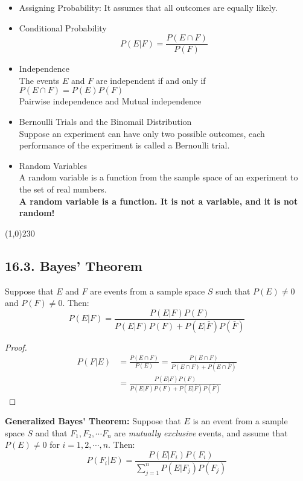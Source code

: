 \begin{itemize}
    \item Assigning Probability: It assumes that all outcomes are equally likely.
    \item Conditional Probability
    $$P(E|F) = \frac{P(E \cap F)}{P(F)}$$
    \item Independence \\
    The events $E$ and $F$ are independent if and only if $P(E \cap F) = P(E)P(F)$ \\
    Pairwise independence and Mutual independence
    \item Bernoulli Trials and the Binomail Distribution\\
    Suppose an experiment can have only two possible outcomes, each performance of the experiment is called a Bernoulli trial.
    \item Random Variables \\
    A random variable is a function from the sample space of an experiment to the set of real numbers. \\
    \textbf{A random variable is a function. It is not a variable, and it is not random!}
\end{itemize}

\begin{center}
\line(1,0){230}
\end{center}

\subsection*{16.3. Bayes' Theorem}

\begin{theorem}
    Suppose that $E$ and $F$ are events from a sample space $S$ such that $P(E) \neq 0$ and $P(F) \neq 0$. Then: $$P(E|F) = \frac{P(E|F)P(F)}{P(E|F)P(F) + P(E|\bar F)P(\bar F)}$$
\end{theorem}
\begin{proof}
    \begin{align*}
        P(F|E) &= \frac{P(E \cap F)}{P(E)} = \frac{P(E\cap F)}{P(E\cap F) + P(E \cap {\bar F})} \\
        &= \frac{P(E|F)P(F)}{P(E|F)P(F) + P(E|\bar F)P(\bar F)}
    \end{align*}
\end{proof}

\begin{theorem}
    \textbf{Generalized Bayes' Theorem: } Suppose that $E$ is an event from a sample space $S$ and that $F_1, F_2, \cdots F_n$ are \textit{mutually exclusive} events, and assume that $P(E) \neq 0$ for $i = 1, 2, \cdots, n$. Then: $$P(F_i|E) = \frac{P(E|F_i)P(F_i)}{\sum_{j=1}^{n} P(E|F_j)P(F_j)}$$
\end{theorem}

